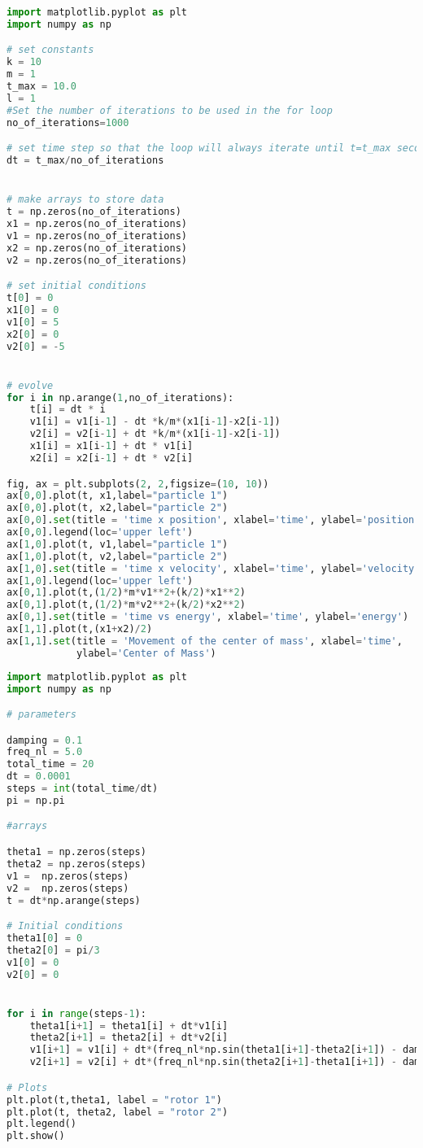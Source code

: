 \begin{lstlisting}[language=Python, frame=lines, basicstyle=\footnotesize, caption={Oscilador Harmônico Duplo}, label={lst:OHS2}]
import matplotlib.pyplot as plt
import numpy as np

# set constants
k = 10
m = 1
t_max = 10.0
l = 1
#Set the number of iterations to be used in the for loop
no_of_iterations=1000

# set time step so that the loop will always iterate until t=t_max seconds 
dt = t_max/no_of_iterations


# make arrays to store data
t = np.zeros(no_of_iterations)
x1 = np.zeros(no_of_iterations)
v1 = np.zeros(no_of_iterations)
x2 = np.zeros(no_of_iterations)
v2 = np.zeros(no_of_iterations)

# set initial conditions
t[0] = 0
x1[0] = 0
v1[0] = 5
x2[0] = 0
v2[0] = -5


# evolve
for i in np.arange(1,no_of_iterations):
    t[i] = dt * i
    v1[i] = v1[i-1] - dt *k/m*(x1[i-1]-x2[i-1])
    v2[i] = v2[i-1] + dt *k/m*(x1[i-1]-x2[i-1])
    x1[i] = x1[i-1] + dt * v1[i]
    x2[i] = x2[i-1] + dt * v2[i]

fig, ax = plt.subplots(2, 2,figsize=(10, 10))
ax[0,0].plot(t, x1,label="particle 1")
ax[0,0].plot(t, x2,label="particle 2")
ax[0,0].set(title = 'time x position', xlabel='time', ylabel='position')
ax[0,0].legend(loc='upper left')
ax[1,0].plot(t, v1,label="particle 1")
ax[1,0].plot(t, v2,label="particle 2")
ax[1,0].set(title = 'time x velocity', xlabel='time', ylabel='velocity')
ax[1,0].legend(loc='upper left')
ax[0,1].plot(t,(1/2)*m*v1**2+(k/2)*x1**2)
ax[0,1].plot(t,(1/2)*m*v2**2+(k/2)*x2**2)
ax[0,1].set(title = 'time vs energy', xlabel='time', ylabel='energy')
ax[1,1].plot(t,(x1+x2)/2)
ax[1,1].set(title = 'Movement of the center of mass', xlabel='time',
            ylabel='Center of Mass')
\end{lstlisting}

\begin{lstlisting}[language=Python, frame=lines, basicstyle=\footnotesize, caption={Rotores acoplados}, label={lst:OH-Rotores}]
import matplotlib.pyplot as plt
import numpy as np

# parameters

damping = 0.1
freq_nl = 5.0
total_time = 20
dt = 0.0001
steps = int(total_time/dt)
pi = np.pi

#arrays

theta1 = np.zeros(steps)
theta2 = np.zeros(steps)
v1 =  np.zeros(steps)
v2 =  np.zeros(steps)
t = dt*np.arange(steps)

# Initial conditions
theta1[0] = 0
theta2[0] = pi/3
v1[0] = 0
v2[0] = 0


for i in range(steps-1):
    theta1[i+1] = theta1[i] + dt*v1[i]
    theta2[i+1] = theta2[i] + dt*v2[i]
    v1[i+1] = v1[i] + dt*(freq_nl*np.sin(theta1[i+1]-theta2[i+1]) - damping*v1[i+1])
    v2[i+1] = v2[i] + dt*(freq_nl*np.sin(theta2[i+1]-theta1[i+1]) - damping*v2[i+1])

# Plots
plt.plot(t,theta1, label = "rotor 1")
plt.plot(t, theta2, label = "rotor 2")
plt.legend()
plt.show()
\end{lstlisting}

